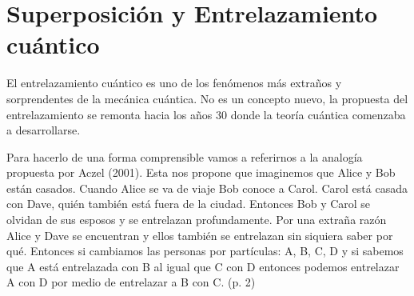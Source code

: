 \documentclass[11pt,a4paper]{article}
\begin{document}
\section*{Superposición y Entrelazamiento cuántico}

El entrelazamiento cuántico es uno de los fenómenos más extraños y sorprendentes de la mecánica cuántica. No es un concepto nuevo, la propuesta del entrelazamiento se remonta hacia los años 30 donde la teoría cuántica comenzaba a desarrollarse. 

Para hacerlo de una forma comprensible vamos a referirnos a la analogía propuesta por Aczel (2001). Esta nos propone que imaginemos que Alice y Bob están casados. Cuando Alice se va de viaje Bob conoce a Carol. Carol está casada con Dave, quién también está fuera de la ciudad. Entonces Bob y Carol se olvidan de sus esposos y se entrelazan profundamente. Por una extraña razón Alice y Dave se encuentran y ellos también se entrelazan sin siquiera saber por qué. Entonces si cambiamos las personas por partículas: A, B, C, D y si sabemos que A está entrelazada con B al igual que C con D  entonces podemos entrelazar A con D por medio de entrelazar a B con C. (p. 2)
\end{document}

